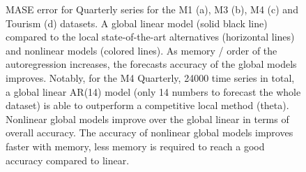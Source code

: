 \documentclass[a4paper]{article}
\theoremstyle{custom}
\begin{document}
\begin{figure}
{}
\caption{MASE error for Quarterly series for the M1 (a), M3 (b), M4 (c) and Tourism (d) datasets. A global linear model (solid black line) compared to the local state-of-the-art alternatives (horizontal lines) and nonlinear models (colored lines). As memory / order of the autoregression increases, the forecasts accuracy of the global models improves. Notably, for the M4 Quarterly, 24000 time series in total, a global linear AR(14) model (only 14 numbers to forecast the whole dataset) is able to outperform a competitive local method (theta). Nonlinear global models improve over the global linear in terms of overall accuracy. The accuracy of nonlinear global models improves faster with memory, less memory is required to reach a good accuracy compared to linear.}
\label{fig:totalquart}
\end{figure}
\end{document}
